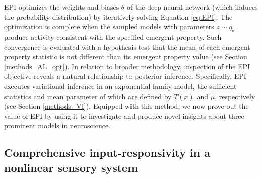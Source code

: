 \documentclass[11pt]{article}
\begin{document}
EPI optimizes the weights and biases $\theta$ of the deep neural network (which induces the probability distribution) by iteratively solving Equation \ref{eq:EPI}. 
The optimization is complete when the sampled models with parameters $z \sim q_\theta$ produce activity consistent with the specified emergent property.  
Such convergence is evaluated with a hypothesis test that the mean of each emergent property statistic is not different than its emergent property value (see Section \ref{methods_AL_opt}). 
In relation to broader methodology, inspection of the EPI objective reveals a natural relationship to posterior inference.
Specifically, EPI executes variational inference in an exponential family model, the sufficient statistics and mean parameter of which are defined by $T(x)$ and $\mu$, respectively (see Section \ref{methods_VI}).
Equipped with this method, we now prove out the value of EPI by using it to investigate and produce novel insights about three prominent models in neuroscience.

\subsection{Comprehensive input-responsivity in a nonlinear sensory system} \label{results_V1}
\end{document}
